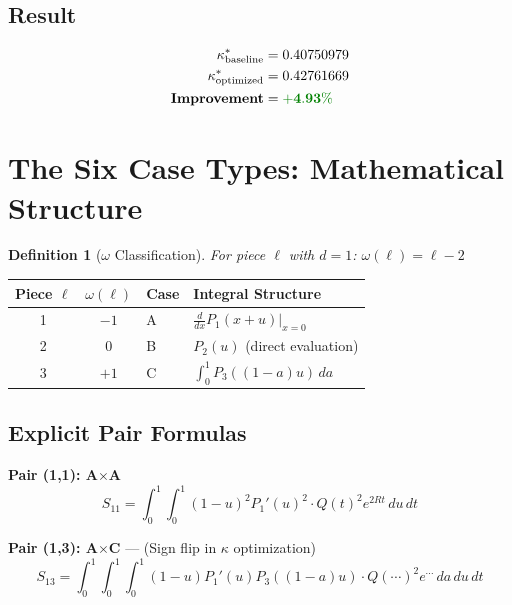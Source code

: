 \documentclass[11pt]{article}
\newtheorem{definition}{Definition}
\begin{document}
\subsection{Result}

\begin{align*}
\kappa^*_{\text{baseline}} &= 0.40750979 \\
\kappa^*_{\text{optimized}} &= 0.42761669 \\
\textbf{Improvement} &= \textcolor{improvement}{\mathbf{+4.93\%}}
\end{align*}

\section{The Six Case Types: Mathematical Structure}

\begin{definition}[$\omega$ Classification]
For piece $\ell$ with $d=1$: $\omega(\ell) = \ell - 2$
\end{definition}

\begin{center}
\begin{tabular}{ccll}
\toprule
Piece $\ell$ & $\omega(\ell)$ & Case & Integral Structure \\
\midrule
1 & $-1$ & A & $\displaystyle \frac{d}{dx} P_1(x+u)\Big|_{x=0}$ \\[2ex]
2 & $0$ & B & $P_2(u)$ (direct evaluation) \\[1ex]
3 & $+1$ & C & $\displaystyle \int_0^1 P_3((1-a)u) \, da$ \\
\bottomrule
\end{tabular}
\end{center}

\subsection{Explicit Pair Formulas}

\textbf{Pair (1,1): A$\times$A}
\begin{equation}
S_{11} = \int_0^1 \int_0^1 (1-u)^2 P_1'(u)^2 \cdot Q(t)^2 e^{2Rt} \, du\, dt
\end{equation}

\textbf{Pair (1,3): A$\times$C} --- \textcolor{signflip}{(Sign flip in $\kappa$ optimization)}
\begin{equation}
S_{13} = \int_0^1 \int_0^1 \int_0^1 (1-u) P_1'(u) P_3((1-a)u) \cdot Q(\cdots)^2 e^{\cdots} \, da\, du\, dt
\end{equation}
\end{document}
